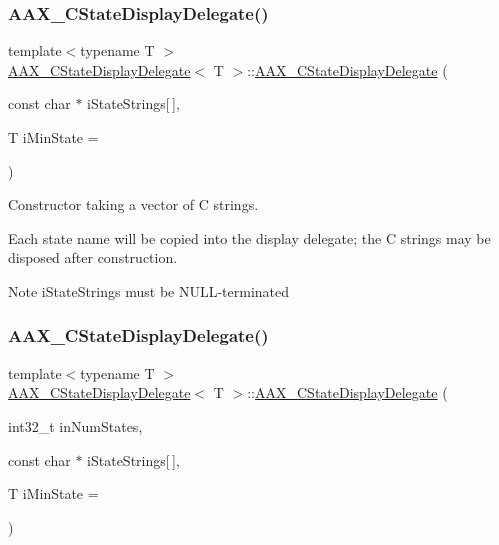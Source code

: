 \subsubsection{\texorpdfstring{AAX\_CStateDisplayDelegate()}{AAX\_CStateDisplayDelegate()}\hspace{0.1cm}{\footnotesize\ttfamily [1/4]}}
{\footnotesize\ttfamily template$<$typename T $>$ \\
\mbox{\hyperlink{a01561}{A\+A\+X\+\_\+\+C\+State\+Display\+Delegate}}$<$ T $>$\+::\mbox{\hyperlink{a01561}{A\+A\+X\+\_\+\+C\+State\+Display\+Delegate}} (\begin{DoxyParamCaption}\item[{const char $\ast$}]{i\+State\+Strings\mbox{[}$\,$\mbox{]},  }\item[{T}]{i\+Min\+State = {} }\end{DoxyParamCaption})\hspace{0.3cm}{\ttfamily [explicit]}}



Constructor taking a vector of C strings. 

Each state name will be copied into the display delegate; the C strings may be disposed after construction.

\begin{DoxyNote}{Note}
{\ttfamily i\+State\+Strings} must be N\+U\+L\+L-\/terminated 
\end{DoxyNote}
\mbox{\label{a01561_ae9b9b548d196af94bc7392208da8adfe}} 
\subsubsection{\texorpdfstring{AAX\_CStateDisplayDelegate()}{AAX\_CStateDisplayDelegate()}\hspace{0.1cm}{\footnotesize\ttfamily [2/4]}}
{\footnotesize\ttfamily template$<$typename T $>$ \\
\mbox{\hyperlink{a01561}{A\+A\+X\+\_\+\+C\+State\+Display\+Delegate}}$<$ T $>$\+::\mbox{\hyperlink{a01561}{A\+A\+X\+\_\+\+C\+State\+Display\+Delegate}} (\begin{DoxyParamCaption}\item[{int32\+\_\+t}]{in\+Num\+States,  }\item[{const char $\ast$}]{i\+State\+Strings\mbox{[}$\,$\mbox{]},  }\item[{T}]{i\+Min\+State = {} }\end{DoxyParamCaption})\hspace{0.3cm}{\ttfamily [explicit]}}



